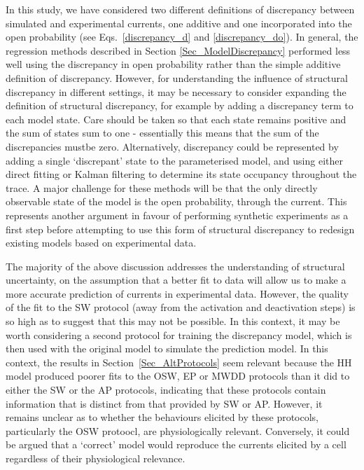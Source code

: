 \documentclass[11pt,a4paper,oneside]{article}
\begin{document}
In this study, we have considered two different definitions of discrepancy between simulated and experimental currents, one additive and one incorporated into the open probability (see Eqs.~\eqref{discrepancy_d} and \eqref{discrepancy_do}). In general, the regression methods described in Section \ref{Sec_ModelDiscrepancy} performed less well using the discrepancy in open probability rather than the simple additive definition of discrepancy. However, for understanding the influence of structural discrepancy in different settings, it may be necessary to consider expanding the definition of structural discrepancy, for example by adding a discrepancy term to each model state. Care should be taken so that each state remains positive and the sum of states sum to one - essentially this means that the sum of the discrepancies mustbe zero. Alternatively, discrepancy could be represented by adding a single `discrepant' state to the parameterised model, and using either direct fitting or Kalman filtering to determine its state occupancy throughout the trace. A major challenge for these methods will be that the only directly observable state of the model is the open probability, through the current. This represents another argument in favour of performing synthetic experiments as a first step before attempting to use this form of structural discrepancy to redesign existing models based on experimental data.

The majority of the above discussion addresses the understanding of structural uncertainty, on the assumption that a better fit to data will allow us to make a more accurate prediction of currents in experimental data. However, the quality of the fit to the SW protocol (away from the activation and deactivation steps) is so high as to suggest that this may not be possible. In this context, it may be worth considering a second protocol for training the discrepancy model, which is then used with the original model to simulate the prediction model. In this context, the results in Section~\ref{Sec_AltProtocols} seem relevant because the HH model produced poorer fits to the OSW, EP or MWDD protocols than it did to either the SW or the AP protocols, indicating that these protocols contain information that is distinct from that provided by SW or AP. However, it remains unclear as to whether the behaviours elicited by these protocols, particularly the OSW protoocl, are physiologically relevant. Conversely, it could be argued that a `correct' model would reproduce the currents elicited by a cell regardless of their physiological relevance.
\end{document}
